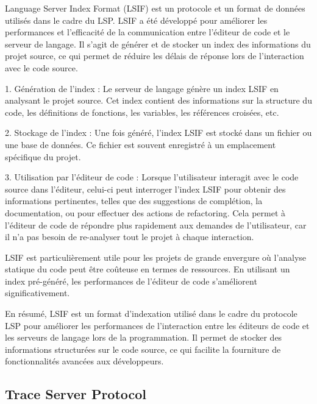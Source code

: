 Language Server Index Format (LSIF) est un protocole et un format de données utilisés dans le cadre du LSP. LSIF a été développé pour améliorer les performances et l'efficacité de la communication entre l'éditeur de code et le serveur de langage. Il s'agit de générer et de stocker un index des informations du projet source, ce qui permet de réduire les délais de réponse lors de l'interaction avec le code source.

1. Génération de l'index : Le serveur de langage génère un index LSIF en analysant le projet source. Cet index contient des informations sur la structure du code, les définitions de fonctions, les variables, les références croisées, etc.

2. Stockage de l'index : Une fois généré, l'index LSIF est stocké dans un fichier ou une base de données. Ce fichier est souvent enregistré à un emplacement spécifique du projet.

3. Utilisation par l'éditeur de code : Lorsque l'utilisateur interagit avec le code source dans l'éditeur, celui-ci peut interroger l'index LSIF pour obtenir des informations pertinentes, telles que des suggestions de complétion, la documentation, ou pour effectuer des actions de refactoring. Cela permet à l'éditeur de code de répondre plus rapidement aux demandes de l'utilisateur, car il n'a pas besoin de re-analyser tout le projet à chaque interaction.

LSIF est particulièrement utile pour les projets de grande envergure où l'analyse statique du code peut être coûteuse en termes de ressources. En utilisant un index pré-généré, les performances de l'éditeur de code s'améliorent significativement.

En résumé, LSIF est un format d'indexation utilisé dans le cadre du protocole LSP pour améliorer les performances de l'interaction entre les éditeurs de code et les serveurs de langage lors de la programmation. Il permet de stocker des informations structurées sur le code source, ce qui facilite la fourniture de fonctionnalités avancées aux développeurs.


\subsection{Trace Server Protocol}


